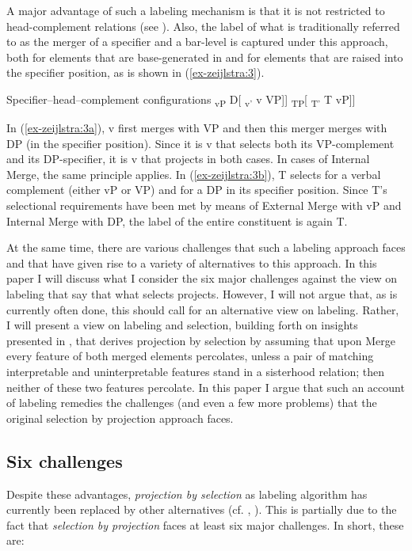 \documentclass[output=paper
,modfonts
,nonflat]{langsci/langscibook}
\begin{document}
A major advantage of such a labeling mechanism is that it is not restricted to head-complement relations (see \citealt{Adger2003}). Also, the label of what is traditionally referred to as the merger of a specifier and a bar-level is captured under this approach, both for elements that are base-generated in and for elements that are raised into the specifier position, as is shown in (\ref{ex-zeijlstra:3}).

\begin{exe}
	\ex Specifier–head–complement configurations \label{ex-zeijlstra:3}
	\xlist
	\ex {[} \textsubscript{vP} D{[} \textsubscript{v'} v VP{]}{]} \label{ex-zeijlstra:3a}
	\ex {[} \textsubscript{TP}{[} \textsubscript{T'} T vP{]}{]} \label{ex-zeijlstra:3b}
	\endxlist
\end{exe}
In (\ref{ex-zeijlstra:3a}), v first merges with VP and then this merger merges with DP (in the specifier position). Since it is v that selects both its VP-complement and its DP-specifier, it is v that projects in both cases. In cases of Internal Merge, the same principle applies. In (\ref{ex-zeijlstra:3b}), T selects for a verbal complement (either vP or VP) and for a DP in its specifier position. Since T’s selectional requirements have been met by means of External Merge with vP and Internal Merge with DP, the label of the entire constituent is again T.

At the same time, there are various challenges that such a labeling approach faces and that have given rise to a variety of alternatives to this approach. In this paper I will discuss what I consider the six major challenges against the view on labeling that say that what selects projects. However, I will not argue that, as is currently often done, this should call for an alternative view on labeling. Rather, I will present a view on labeling and selection, building forth on insights presented in \citet{Adger2003}, that derives projection by selection by assuming that upon Merge every feature of both merged elements percolates, unless a pair of matching interpretable and uninterpretable features stand in a sisterhood relation; then neither of these two features percolate. In this paper I argue that such an account of labeling remedies the challenges (and even a few more problems) that the original selection by projection approach faces.

\subsection{Six challenges} \label{sec-zeijlstra:1.2}
Despite these advantages, \textit{projection by selection} as labeling algorithm has currently been replaced by other alternatives (cf. \citealt{Collins2002}, \citealt{Chomsky2008, Chomsky2013, Chomsky2015}). This is partially due to the fact that \textit{selection by projection} faces at least six major challenges. In short, these are: 
\end{document}
